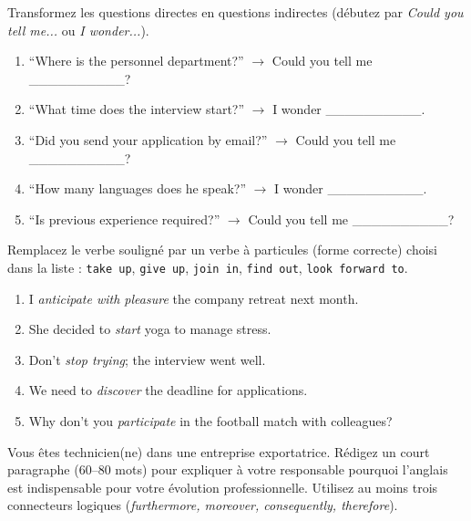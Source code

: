 \documentclass[11pt]{article}
\begin{document}
\begin{exercice}
Transformez les questions directes en questions indirectes (débutez par \textit{Could you tell me...} ou \textit{I wonder...}).
\begin{enumerate}
    \item ``Where is the personnel department?'' $\rightarrow$ Could you tell me \_\_\_\_\_\_\_\_\_\_?
    \item ``What time does the interview start?'' $\rightarrow$ I wonder \_\_\_\_\_\_\_\_\_\_.
    \item ``Did you send your application by email?'' $\rightarrow$ Could you tell me \_\_\_\_\_\_\_\_\_\_?
    \item ``How many languages does he speak?'' $\rightarrow$ I wonder \_\_\_\_\_\_\_\_\_\_.
    \item ``Is previous experience required?'' $\rightarrow$ Could you tell me \_\_\_\_\_\_\_\_\_\_?
\end{enumerate}
\end{exercice}

\begin{exercice}
Remplacez le verbe souligné par un verbe à particules (forme correcte) choisi dans la liste : \texttt{take up}, \texttt{give up}, \texttt{join in}, \texttt{find out}, \texttt{look forward to}.
\begin{enumerate}
    \item I \textit{anticipate with pleasure} the company retreat next month.
    \item She decided to \textit{start} yoga to manage stress.
    \item Don't \textit{stop trying}; the interview went well.
    \item We need to \textit{discover} the deadline for applications.
    \item Why don't you \textit{participate} in the football match with colleagues?
\end{enumerate}
\end{exercice}

\begin{exercice}
Vous êtes technicien(ne) dans une entreprise exportatrice. Rédigez un court paragraphe (60--80 mots) pour expliquer à votre responsable pourquoi l'anglais est indispensable pour votre évolution professionnelle. Utilisez au moins trois connecteurs logiques (\textit{furthermore, moreover, consequently, therefore}).
\end{exercice}
\end{document}
